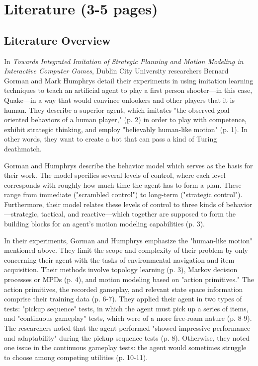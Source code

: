 \chapter{Literature (3-5 pages)}
\label{ch:Literature}



\section{Literature Overview}

In {\it Towards Integrated Imitation of Strategic Planning and Motion Modeling in Interactive Computer Games}, Dublin City University researchers Bernard Gorman and Mark Humphrys detail their experiments in using imitation learning techniques to teach an artificial agent to play a first person shooter—in this case, Quake—in a way that would convince onlookers and other players that it is human. They describe a superior agent, which imitates "the observed goal-oriented behaviors of a human player," (p. 2) in order to play with competence, exhibit strategic thinking, and employ "believably human-like motion" (p. 1). In other words, they want to create a bot that can pass a kind of Turing deathmatch.

Gorman and Humphrys describe the behavior model which serves as the basis for their work. The model specifies several levels of control, where each level corresponds with roughly how much time the agent has to form a plan. These range from immediate ("scrambled control") to long-term ("strategic control"). Furthermore, their model relates these levels of control to three kinds of behavior—strategic, tactical, and reactive—which together are supposed to form the building blocks for an agent's motion modeling capabilities (p. 3).

In their experiments, Gorman and Humphrys emphasize the "human-like motion" mentioned above. They limit the scope and complexity of their problem by only concerning their agent with the tasks of environmental navigation and item acquisition. Their methods involve topology learning (p. 3), Markov decision processes or MPDs (p. 4), and motion modeling based on "action primitives." The action primitives, the recorded gameplay, and relevant state space information comprise their training data (p. 6-7). They applied their agent in two types of tests: "pickup sequence" tests, in which the agent must pick up a series of items, and "continuous gameplay" tests, which were of a more free-roam nature (p. 8-9). The researchers noted that the agent performed "showed impressive performance and adaptability" during the pickup sequence tests (p. 8). Otherwise, they noted one issue in the continuous gameplay tests: the agent would sometimes struggle to choose among competing utilities (p. 10-11).

